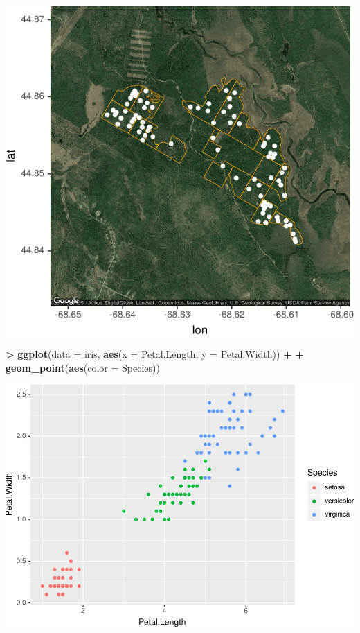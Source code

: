 \documentclass[]{krantz}
\makeatletter
\newenvironment{Shaded}{\begin{snugshade}}{\end{snugshade}}
\newcommand{\DataTypeTok}[1]{\textcolor[rgb]{0.27,0.27,0.27}{#1}}
\newcommand{\KeywordTok}[1]{\textcolor[rgb]{0.27,0.27,0.27}{\textbf{#1}}}
\newcommand{\NormalTok}[1]{#1}
\newcommand{\OperatorTok}[1]{\textcolor[rgb]{0.43,0.43,0.43}{\textbf{#1}}}
\newcommand{\StringTok}[1]{\textcolor[rgb]{0.5,0.5,0.5}{#1}}
\newenvironment{kframe}{%
\medskip{}
\setlength{\fboxsep}{.8em}
 \def\at@end@of@kframe{}%
 \ifinner\ifhmode%
  \def\at@end@of@kframe{\end{minipage}}%
  \begin{minipage}{\columnwidth}%
 \fi\fi%
 \def\FrameCommand##1{\hskip\@totalleftmargin \hskip-\fboxsep
 \colorbox{shadecolor}{##1}\hskip-\fboxsep
     \hskip-\linewidth \hskip-\@totalleftmargin \hskip\columnwidth}%
 \MakeFramed {\advance\hsize-\width
   \@totalleftmargin\z@ \linewidth\hsize
   \@setminipage}}%
 {\par\unskip\endMakeFramed%
 \at@end@of@kframe}
\renewenvironment{Shaded}{\begin{kframe}}{\end{kframe}}
\makeatother
\begin{document}
\includegraphics{bookdown_files/figure-latex/unnamed-chunk-230-1.pdf}

\begin{Shaded}
\begin{Highlighting}[]
\OperatorTok{>}\StringTok{ }\KeywordTok{ggplot}\NormalTok{(}\DataTypeTok{data =}\NormalTok{ iris, }\KeywordTok{aes}\NormalTok{(}\DataTypeTok{x =}\NormalTok{ Petal.Length, }\DataTypeTok{y =}\NormalTok{ Petal.Width)) }\OperatorTok{+}\StringTok{ }
\OperatorTok{+}\StringTok{   }\KeywordTok{geom_point}\NormalTok{(}\KeywordTok{aes}\NormalTok{(}\DataTypeTok{color =}\NormalTok{ Species))}
\end{Highlighting}
\end{Shaded}

\includegraphics{bookdown_files/figure-latex/unnamed-chunk-230-2.pdf}
\end{document}
